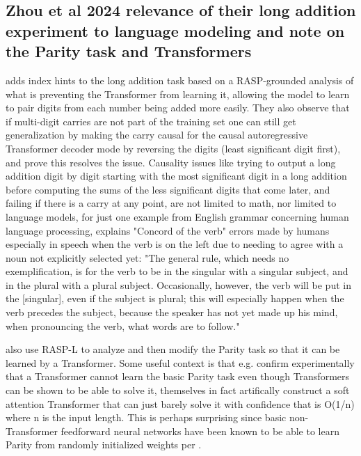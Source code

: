 \documentclass[11pt]{article}
\begin{document}
\subsection{Zhou et al 2024 relevance of their long addition experiment to language modeling and note on the Parity task and Transformers}
\label{appendix_long_addition_and_parity}
\citep{Zhou2024} adds index hints to the long addition task based on a RASP-grounded analysis of what is preventing the Transformer from learning it, allowing the model to learn to pair digits from each number being added more easily. They also observe that if multi-digit carries are not part of the training set one can still get generalization by making the carry causal for the causal autoregressive Transformer decoder mode by reversing the digits (least significant digit first), and prove this resolves the issue. Causality issues like trying to output a long addition digit by digit starting with the most significant digit in a long addition before computing the sums of the less significant digits that come later, and failing if there is a carry at any point, are not limited to math, nor limited to language models, for just one example from English grammar concerning human language processing, \citep{jespersen1913modernenglishgrammar1954reprint} explains "Concord of the verb" errors made by humans especially in speech when the verb is on the left due to needing to agree with a noun not explicitly selected yet: "The general rule, which needs no exemplification, is for the verb to be in the singular with a singular subject, and in the plural with a plural subject. Occasionally, however, the verb will be put in the [singular], even if the subject is plural; this will especially happen when the verb precedes the subject, because the speaker has not yet made up his mind, when pronouncing the verb, what words are to follow."

\citep{Zhou2024} also use RASP-L to analyze and then modify the Parity task so that it can be learned by a Transformer.
Some useful context is that e.g. \citep{Chiang2022} confirm experimentally that a Transformer cannot learn the basic Parity task even though Transformers can be shown to be able to solve it, \citep{Chiang2022} themselves in fact artifically construct a soft attention Transformer that can just barely solve it with confidence that is O(1/n) where n is the input length. 
This is perhaps surprising since basic non-Transformer feedforward neural networks have been known to be able to learn Parity from randomly initialized weights per \citep{10.7551/mitpress/4943.003.0128}.
\end{document}
